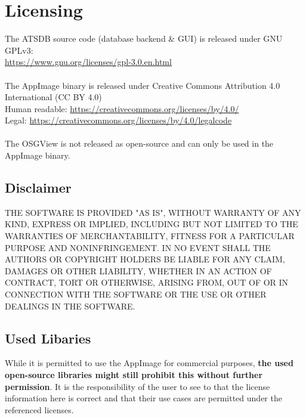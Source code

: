 \chapter{Licensing}
\label{sec:licensing}

The ATSDB source code (database backend \& GUI) is released under GNU GPLv3: \\
\url{https://www.gnu.org/licenses/gpl-3.0.en.html} \\\\

The AppImage binary is released under Creative Commons Attribution 4.0 International (CC BY 4.0) \\
Human readable: \url{https://creativecommons.org/licenses/by/4.0/} \\
Legal: \url{https://creativecommons.org/licenses/by/4.0/legalcode} \\\\

The OSGView is not released as open-source and can only be used in the AppImage binary.

\section{Disclaimer}

THE SOFTWARE IS PROVIDED "AS IS", WITHOUT WARRANTY OF ANY KIND, EXPRESS OR IMPLIED, INCLUDING BUT NOT LIMITED TO THE WARRANTIES OF MERCHANTABILITY, FITNESS FOR A PARTICULAR PURPOSE AND NONINFRINGEMENT. IN NO EVENT SHALL THE AUTHORS OR COPYRIGHT HOLDERS BE LIABLE FOR ANY CLAIM, DAMAGES OR OTHER LIABILITY, WHETHER IN AN ACTION OF CONTRACT, TORT OR OTHERWISE, ARISING FROM, OUT OF OR IN CONNECTION WITH THE SOFTWARE OR THE USE OR OTHER DEALINGS IN THE SOFTWARE.

\section{Used Libaries}

While it is permitted to use the AppImage for commercial purposes, \textbf{the used open-source libraries might still prohibit this without further permission}. It is the responsibility of the user to see to that the license information here is correct and that their use cases are permitted under the referenced licenses.

